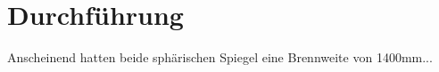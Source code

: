 \section{Durchführung}
\label{sec:Durchführung}

Anscheinend hatten beide sphärischen Spiegel eine Brennweite von 1400mm...
